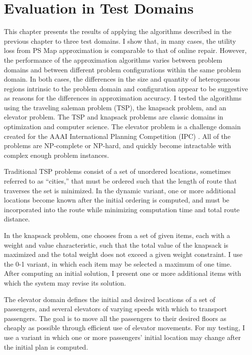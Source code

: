 \chapter{Evaluation in Test Domains}
\thispagestyle{plain}

\label{ch:evaluation}
This chapter presents the results of applying the algorithms described in the previous chapter to three test domains.  I show that, in many cases, the utility loss from PS Map approximation is comparable to that of online repair.  However, the performance of the approximation algorithms varies between problem domains and between different problem configurations within the same problem domain.  In both cases, the differences in the size and quantity of heterogeneous regions intrinsic to the problem domain and configuration appear to be suggestive as reasons for the differences in approximation accuracy.  I tested the algorithms using the traveling saleman problem (TSP), the knapsack problem, and an elevator problem.  The TSP and knapsack problems are classic domains in optimization and computer science.  The elevator problem is a challenge domain created for the AAAI International Planning Competition (IPC) \citep{coles2013survey}.  All of the problems are NP-complete or NP-hard, and quickly become intractable with complex enough problem instances.



Traditional TSP problems consist of a set of unordered locations, sometimes referred to as ``cities,'' that must be ordered such that the length of route that traverses the set is minimized.  In the dynamic variant, one or more additional locations become known after the initial ordering is computed, and must be incorporated into the route while minimizing computation time and total route distance.

In the knapsack problem, one chooses from a set  of given items, each with a weight and value characteristic, such that the total value of the knapsack is maximized and the total weight does not exceed a given weight constraint.  I use the 0-1 variant, in which each item may  be selected a maximum of one time.  After computing an initial solution, I present one or more  additional items with which the system may revise its solution.

The elevator domain defines the initial and desired locations of a set of  passengers, and several elevators of varying speeds with which to transport passengers.  The goal is to move all the passengers to their desired floors as cheaply as possible through efficient use of elevator movements.  For my testing, I use a variant in which one or more passengers' initial location may change after the initial plan is computed.

